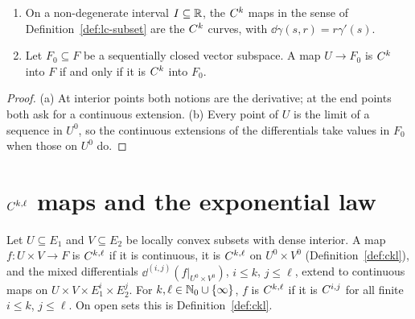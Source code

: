 \begin{proposition}
  \label{prop:lc-curves}
  \leanok
  \begin{enumerate}
    \item On a non-degenerate interval $I \subseteq \mathbb{R}$, the $C^{k}$ maps in the sense of
      Definition~\ref{def:lc-subset} are the $C^{k}$ curves, with
      $\dd\gamma(s, r) = r\gamma'(s)$.
    \item Let $F_0 \subseteq F$ be a sequentially closed vector subspace. A map $U \to F_0$ is
      $C^{k}$ into $F$ if and only if it is $C^{k}$ into $F_0$.
  \end{enumerate}
\end{proposition}

\begin{proof}
  \leanok
  (a) At interior points both notions are the derivative; at the end points both ask for a
  continuous extension. (b) Every point of $U$ is the limit of a sequence in $U^0$, so the
  continuous extensions of the differentials take values in $F_0$ when those on $U^0$ do.
\end{proof}

\section{\texorpdfstring{$C^{k,\ell}$}{Ckl} maps and the exponential law}

\begin{definition}
  \label{def:lc-ckl}
  \leanok
  Let $U \subseteq E_1$ and $V \subseteq E_2$ be locally convex subsets with dense interior. A
  map $f \colon U \times V \to F$ is $C^{k,\ell}$ if it is continuous, it is $C^{k,\ell}$ on
  $U^0 \times V^0$ (Definition~\ref{def:ckl}), and the mixed differentials
  $\dd^{(i,j)}(f|_{U^0 \times V^0})$, $i \le k$, $j \le \ell$, extend to continuous maps on
  $U \times V \times E_1^i \times E_2^j$. For $k, \ell \in \mathbb{N}_0 \cup \{\infty\}$, $f$ is
  $C^{k,\ell}$ if it is $C^{i,j}$ for all finite $i \le k$, $j \le \ell$. On open sets this is
  Definition~\ref{def:ckl}.
\end{definition}


